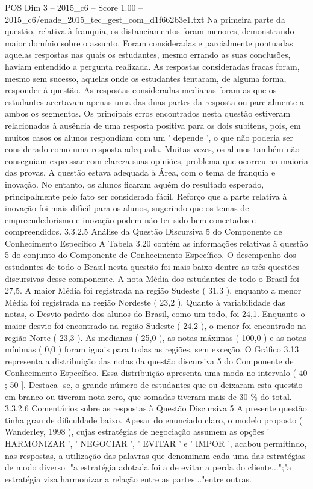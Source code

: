 \begin{textsample}{POS Dim 3 – 2015\_c6 – Score 1.00 – 2015\_c6/enade\_2015\_tec\_gest\_com\_d1f662b3e1.txt}
Na primeira parte da questão, relativa à franquia, os distanciamentos foram menores, demonstrando maior domínio sobre o assunto.
Foram consideradas e parcialmente pontuadas aquelas respostas nas quais os estudantes, mesmo errando as suas conclusões, haviam entendido a pergunta realizada.
As respostas consideradas fracas foram, mesmo sem sucesso, aquelas onde os estudantes tentaram, de alguma forma, responder à questão.
As respostas consideradas medianas foram as que os estudantes acertavam apenas uma das duas partes da resposta ou parcialmente a ambos os segmentos.
Os principais erros encontrados nesta questão estiveram relacionados à ausência de uma resposta positiva para os dois subitens, pois, em muitos casos os alunos respondiam com um ' depende ', o que não poderia ser considerado como uma resposta adequada.
Muitas vezes, os alunos também não conseguiam expressar com clareza suas opiniões, problema que ocorreu na maioria das provas.
A questão estava adequada à Área, com o tema de franquia e inovação.
No entanto, os alunos ficaram aquém do resultado esperado, principalmente pelo fato ser considerada fácil.
Reforço que a parte relativa à inovação foi mais difícil para os alunos, sugerindo que os temas de empreendedorismo e inovação podem não ter sido bem conectados e compreendidos. 3.3.2.5 Análise da Questão Discursiva 5 do Componente de Conhecimento Específico A Tabela 3.20 contém as informações relativas à questão 5 do conjunto do Componente de Conhecimento Específico.
O desempenho dos estudantes de todo o Brasil nesta questão foi mais baixo dentre as três questões discursivas desse componente.
A nota Média dos estudantes de todo o Brasil foi 27,5.
A maior Média foi registrada na região Sudeste ( 31,3 ), enquanto a menor Média foi registrada na região Nordeste ( 23,2 ).
Quanto à variabilidade das notas, o Desvio padrão dos alunos do Brasil, como um todo, foi 24,1.
Enquanto o maior desvio foi encontrado na região Sudeste ( 24,2 ), o menor foi encontrado na região Norte ( 23,3 ).
As medianas ( 25,0 ), as notas máximas ( 100,0 ) e as notas mínimas ( 0,0 ) foram iguais para todas as regiões, sem exceção.
O Gráfico 3.13 representa a distribuição das notas da questão discursiva 5 do Componente de Conhecimento Específico.
Essa distribuição apresenta uma moda no intervalo ( 40 ; 50 ].
Destaca -se, o grande número de estudantes que ou deixaram esta questão em branco ou tiveram nota zero, que somadas tiveram mais de 30 \% do total. 3.3.2.6 Comentários sobre as respostas à Questão Discursiva 5 A presente questão tinha grau de dificuldade baixo.
Apesar do enunciado claro, o modelo proposto ( Wanderley, 1998 ), cujas estratégias de negociação assumem as opções ' HARMONIZAR ', ' NEGOCIAR ', ' EVITAR ' e ' IMPOR ', acabou permitindo, nas respostas, a utilização das palavras que denominam cada uma das estratégias de modo diverso "a estratégia adotada foi a de evitar a perda do cliente...";"a estratégia visa harmonizar a relação entre as partes..."entre outras.

\end{textsample}
